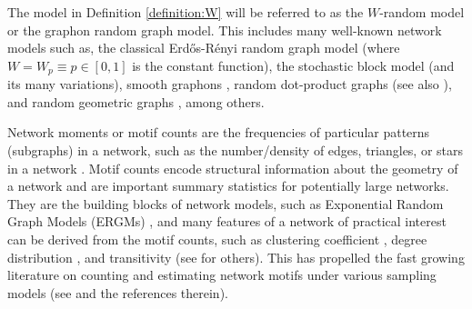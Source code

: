 \documentclass[11pt,reqno]{amsart}
\numberwithin{equation}{section}
\theoremstyle{definition}
\begin{document}
The model in Definition \ref{definition:W} will be referred to as the $W$-random model or the graphon random graph model. This includes many well-known network models such as, the classical Erd\H{o}s-R\'enyi random graph model (where $W = W_p \equiv p\in [0,1]$ is the constant function), the stochastic block model \citep{bickel2009nonparametric,holland1983stochastic} (and its many variations), smooth graphons \cite{gao2015rate}, random dot-product graphs \citep{dotproduct2018statistical,rubin2022statistical} (see also \citet{lei2021}), and random geometric graphs \citep{penrose2003}, among others. 
 

Network moments or motif counts are the frequencies of particular patterns (subgraphs) in a network, such as the number/density of edges, triangles, or stars in a network \cite{experimental2007network,milo2002network,shen2002network}. Motif counts encode structural information about the geometry of a network and are important summary statistics for potentially large networks. They are the building blocks of network models, such as Exponential Random Graph Models (ERGMs) \cite{hunter2008ergm,chatterjee2013estimating,mukherjee2020degeneracy,mukherjee2023statistics,shalizi2013consistency,xu2021signal,xu2021stein}, and many features of a network of practical interest can be derived from the motif counts, such as clustering coefficient \cite{watts1998collective}, degree distribution \cite{networkdegree}, and transitivity \cite{holland1971transitivity} (see \cite{rubinov2010complex} for others).  
This has propelled the fast growing literature on counting and estimating network motifs under various sampling models (see \cite{BDM,triangletripartite,eden2017approximately,gonen2011counting,klusowski2018counting,lyu2023sampling} and the references therein).   
\end{document}
